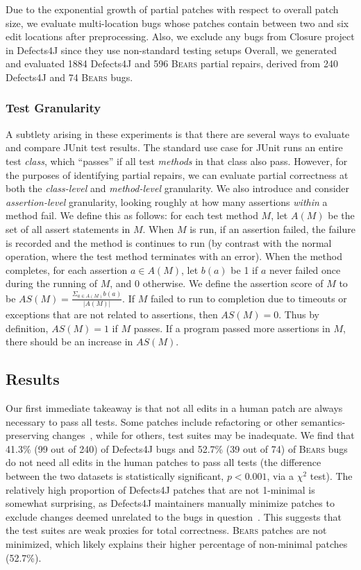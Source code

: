 \documentclass[10pt, conference]{IEEEtran}
\newcommand\bears{\textsc{Bears}\xspace}
\begin{document}
Due to the exponential growth of partial patches with respect to overall patch size,
we evaluate multi-location bugs whose patches 
contain between two and six edit locations after preprocessing.
Also, we exclude any bugs from Closure project in Defects4J since they use non-standard testing setups
Overall, we generated and evaluated 1884 Defects4J and 596 \bears partial repairs,
derived from 240 Defects4J and 74 \bears bugs.

\subsubsection{Test Granularity}

A subtlety arising in these experiments is that there are several ways to
evaluate and compare JUnit test results.  The standard use case for JUnit runs
an entire test \emph{class}, which ``passes'' if all test \emph{methods} in
that class also pass.  However, for the purposes of identifying partial repairs,
we can evaluate partial correctness at both the \emph{class-level} and
\emph{method-level} granularity. 
We also introduce and consider \emph{assertion-level} granularity, looking
roughly at how many assertions \emph{within} a method fail.  We define this as follows:
for each test method $M$, let $A(M)$ be the set of all assert statements in $M$. 
When $M$ is run, if an assertion failed, the failure is recorded and the method 
is continues to run (by contrast with the normal operation, where the test
method terminates with an error).  When the method completes, for each assertion
$a\in A(M)$, let $b(a)$ be 1 if $a$ never failed once during the running of $M$, 
and 0 otherwise. We define the assertion score of $M$ to be 
$AS(M)=\frac{\Sigma_{a\in A(M)}b(a)}{|A(M)|}$. If $M$ failed to run to completion 
due to timeouts or exceptions that are not related to assertions, then
$AS(M)=0$. Thus by definition, $AS(M)=1$ if $M$ passes. If a program passed more 
assertions in $M$, there should be an increase in $AS(M)$.


\subsection{Results}

Our first immediate takeaway is that not all edits
in a human patch are always necessary to pass all tests. 
Some patches 
include refactoring or other semantics-preserving changes~\cite{api-refactoring,
  tangledchanges}, while for others, test suites may be inadequate. 
We find that 41.3\%  (99 out of 240) of Defects4J bugs and 52.7\% (39 out of 74) of
\bears bugs do not need all edits in the human patches
to pass all tests (the difference between the two datasets is statistically
significant, $p < 0.001$, via a 
$\chi^2$ test). 
The relatively high proportion of Defects4J patches that are not 1-minimal is
somewhat surprising, as Defects4J maintainers manually minimize patches to exclude
changes deemed unrelated to the bugs in question~\cite{documentation-maybe}.
This suggests that the test suites are weak proxies for total correctness.
\bears patches are not minimized, which likely explains
their higher percentage of non-minimal patches (52.7\%).
\end{document}
